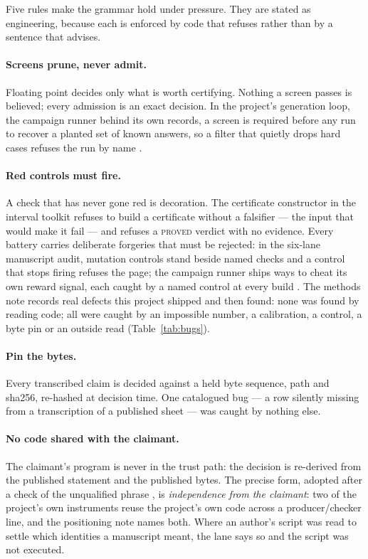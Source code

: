 \documentclass[11pt]{article}
\theoremstyle{plain}
\theoremstyle{definition}
\begin{document}
Five rules make the grammar hold under pressure. They are stated as engineering, because each is enforced by code that refuses rather than by a sentence that advises.

\paragraph{Screens prune, never admit.} Floating point decides only what is worth certifying. Nothing a screen passes is believed; every admission is an exact decision. In the project's generation loop, the campaign runner behind its own records, a screen is required before any run to recover a planted set of known answers, so a filter that quietly drops hard cases refuses the run by name \cite{MethodsNote}.

\paragraph{Red controls must fire.} A check that has never gone red is decoration. The certificate constructor in the interval toolkit refuses to build a certificate without a falsifier --- the input that would make it fail --- and refuses a \textsc{proved} verdict with no evidence. Every battery carries deliberate forgeries that must be rejected: in the six-lane manuscript audit, \AiMutations{} mutation controls stand beside \AiChecks{} named checks and a control that stops firing refuses the page; the campaign runner ships \CheatsN{} ways to cheat its own reward signal, each caught by a named control at every build \cite{MethodsNote}. The methods note records \BugsN{} real defects this project shipped and then found: none was found by reading code; all were caught by an impossible number, a calibration, a control, a byte pin or an outside read (Table~\ref{tab:bugs}).

\paragraph{Pin the bytes.} Every transcribed claim is decided against a held byte sequence, path and sha256, re-hashed at decision time. One catalogued bug --- a row silently missing from a transcription of a published sheet --- was caught by nothing else.

\paragraph{No code shared with the claimant.} The claimant's program is never in the trust path: the decision is re-derived from the published statement and the published bytes. The precise form, adopted after a check of the unqualified phrase \cite{Positioning}, is \emph{independence from the claimant}: two of the project's own instruments reuse the project's own code across a producer/checker line, and the positioning note names both. Where an author's script was read to settle which identities a manuscript meant, the lane says so and the script was not executed.
\end{document}
